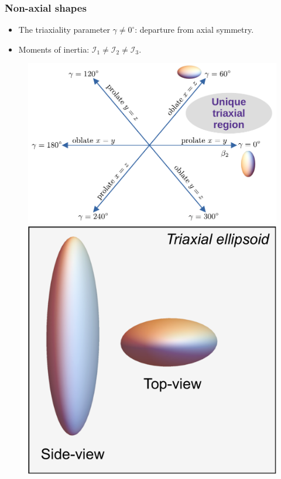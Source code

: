 \documentclass{beamer}
\begin{document}
\begin{frame}
	\frametitle{Non-axial shapes}
	\vspace{-0.2cm}
	\begin{itemize}
		\item The triaxiality parameter $\gamma\neq 0^\circ$: departure from axial symmetry.
		\item Moments of inertia: $\mathcal{I}_{1}\neq\mathcal{I}_{2}\neq\mathcal{I}_{3}$.
	\end{itemize}
	\vspace{-0.2cm}
	\begin{figure}
		\centering
		\includegraphics[scale=0.49]{figures/nice_diagram.pdf}
		\includegraphics[scale=0.20]{figures/triaxial-shape.pdf}
		\vspace{-0.41cm}
	\end{figure}
\end{frame}
\end{document}
